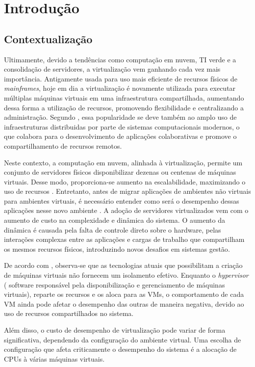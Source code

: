 \chapter{Introdução}
\section{Contextualizaç\~ao}
Ultimamente, devido a tendências como computação em nuvem, TI verde e a consolidação de servidores, a virtualização vem ganhando cada vez mais importância. Antigamente usada para uso mais eficiente de recursos físicos de \textit{mainframes}, hoje em dia a virtualização é novamente utilizada para executar múltiplas máquinas virtuais em uma infraestrutura compartilhada, aumentando dessa forma a utilização de recursos, promovendo flexibilidade e centralizando a administração\cite{huber2011}. Segundo , essa popularidade se deve também ao amplo uso de infraestruturas distribuidas por parte de sistemas computacionais modernos, o que colabora para o desenvolvimento de aplicações colaborativas e promove o compartilhamento de recursos remotos.

Neste contexto, a computação em nuvem, alinhada à virtualização, permite um conjunto de servidores físicos disponibilizar dezenas ou centenas de máquinas virtuais. Desse modo, proporciona-se aumento na escalabilidade, maximizando o uso de recursos \cite{popiolek2012}. Entretanto, antes de migrar aplicações de ambientes não virtuais para ambientes virtuais, é necessário entender como será o desempenho dessas aplicações nesse novo ambiente \cite{benevuto2006}. A adoção de servidores virtualizados vem com o aumento de custo na complexidade e dinâmica do sistema. O aumento da dinâmica é causada pela falta de controle direto sobre o hardware, pelas interações complexas entre as aplicações e cargas de trabalho que compartilham os mesmos recursos físicos, introduzindo novos desafios em sistemas gestão\cite{huber2011}.

De acordo com , observa-se que as tecnologias atuais que possibilitam a criação de máquinas virtuais não fornecem um isolamento efetivo. Enquanto o \textit{hypervisor} ( software responsável pela disponibilização e gerenciamento de máquinas virtuais), reparte os recursos e os aloca para as VMs, o comportamento de cada VM ainda pode afetar o desempenho das outras de maneira negativa, devido ao uso de recursos compartilhados no sistema.  

Além disso, o custo de desempenho de virtualização pode variar de forma significativa, dependendo da configuração do ambiente virtual. Uma escolha de configuração que afeta criticamente o desempenho do sistema é a alocação de CPUs à várias máquinas virtuais\cite{benevuto2006}.

